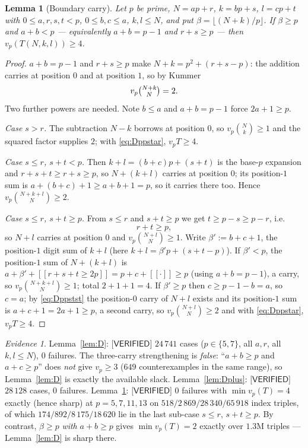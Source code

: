 \documentclass[11pt,reqno]{amsart}
\theoremstyle{plain}
\newtheorem{lemma}[theorem]{Lemma}
\theoremstyle{definition}
\theoremstyle{remark}
\newtheorem{evidence}[theorem]{Evidence}
\numberwithin{equation}{section}
\newcommand{\ii}[1]{[\![#1]\!]}
\newcommand{\VERIFIED}{\textsf{[VERIFIED]}}
\begin{document}
\begin{lemma}[Boundary carry]\label{lem:Dpp}
Let $p$ be prime, $N=ap+r$, $k=bp+s$, $l=cp+t$ with $0\le a,r,s,t<p$, $0\le b,c\le a$,
$k,l\le N$, and put $\beta=\lfloor(N+k)/p\rfloor$. If $\beta\ge p$ \emph{and} $a+b<p$ ---
equivalently $a+b=p-1$ and $r+s\ge p$ --- then $v_p(T(N,k,l))\ge4$.
\end{lemma}

\begin{proof}
$a+b=p-1$ and $r+s\ge p$ make $N+k=p^2+(r+s-p)$: the addition carries at position $0$ and at
position $1$, so by Kummer
\begin{equation}\label{eq:Dppstar}
v_p\tbinom{N+k}{N}=2 .
\end{equation}
Two further powers are needed. Note $b\le a$ and $a+b=p-1$ force $2a+1\ge p$.

\emph{Case $s>r$.} The subtraction $N-k$ borrows at position $0$, so $v_p\binom{N}{k}\ge1$ and
the squared factor supplies $2$; with \eqref{eq:Dppstar}, $v_pT\ge4$.

\emph{Case $s\le r$, $s+t<p$.} Then $k+l=(b+c)p+(s+t)$ is the base-$p$ expansion and
$r+s+t\ge r+s\ge p$, so $N+(k+l)$ carries at position $0$; its position-$1$ sum is
$a+(b+c)+1\ge a+b+1=p$, so it carries there too. Hence $v_p\binom{N+k+l}{N}\ge2$.

\emph{Case $s\le r$, $s+t\ge p$.} From $s\le r$ and $s+t\ge p$ we get $t\ge p-s\ge p-r$, i.e.
\begin{equation}\label{eq:Dppstst}
r+t\ge p ,
\end{equation}
so $N+l$ carries at position $0$ and $v_p\binom{N+l}{N}\ge1$. Write $\beta':=b+c+1$, the
position-$1$ digit sum of $k+l$ (here $k+l=\beta'p+(s+t-p)$).
If $\beta'<p$, the position-$1$ sum of $N+(k+l)$ is
$a+\beta'+\ii{r+s+t\ge2p}=p+c+\ii{\cdot}\ge p$ (using $a+b=p-1$), a carry, so
$v_p\binom{N+k+l}{N}\ge1$; total $2+1+1=4$. If $\beta'\ge p$ then $c\ge p-1-b=a$, so $c=a$; by
\eqref{eq:Dppstst} the position-$0$ carry of $N+l$ exists and its position-$1$ sum is
$a+c+1=2a+1\ge p$, a second carry, so $v_p\binom{N+l}{N}\ge2$ and with \eqref{eq:Dppstar},
$v_pT\ge4$.
\end{proof}

\begin{evidence}\label{ev:D}
Lemma~\ref{lem:D}: $\VERIFIED$ $24\,741$ cases ($p\in\{5,7\}$, all $a,r$, all $k,l\le N$), $0$
failures. The three-carry strengthening is \emph{false}: ``$a+b\ge p$ and $a+c\ge p$'' does
\emph{not} give $v_p\ge3$ ($649$ counterexamples in the same range), so Lemma~\ref{lem:D} is
exactly the available slack. Lemma~\ref{lem:Dplus}: $\VERIFIED$ $28\,128$ cases, $0$ failures.
Lemma~\ref{lem:Dpp}: $\VERIFIED$ $0$ failures with $\min v_p(T)=4$ exactly (hence sharp) at
$p=5,7,11,13$ on $518/2\,869/28\,340/65\,918$ index triples, of which
$174/892/8\,175/18\,620$ lie in the last sub-case $s\le r$, $s+t\ge p$. By contrast,
$\beta\ge p$ \emph{with} $a+b\ge p$ gives $\min v_p(T)=2$ exactly over $1.3$M triples ---
Lemma~\ref{lem:D} is sharp there.
\end{evidence}
\end{document}
